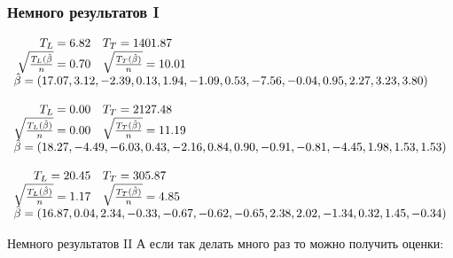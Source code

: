 \documentclass[14pt, fleqn, xcolor={dvipsnames, table}, hyperref={unicode}, babel={english,russian}, inputenc=utf8x]{beamer}
\begin{document}
\begin{frame}[t]\frametitle{Немного результатов I}
\scriptsize
$$\begin{array}{rl}
T_L= 6.82 & T_T = 1401.87 \\ 
\sqrt{\frac{T_L(\hat{\beta}}{n}} = 0.70 & \sqrt{\frac{T_T(\hat{\beta})}{n}} = 10.01 \\ 
\multicolumn{2}{l}{\hat{\beta} = (17.07, 3.12, -2.39, 0.13, 1.94, -1.09, 0.53, -7.56, -0.04, 0.95, 2.27, 3.23, 3.80)} \\ 
\\ 
T_L= 0.00 & T_T = 2127.48 \\ 
\sqrt{\frac{T_L(\hat{\beta})}{n}} = 0.00 & \sqrt{\frac{T_T(\hat{\beta})}{n}} = 11.19 \\ 
\multicolumn{2}{l}{\hat{\beta} = (18.27, -4.49, -6.03, 0.43, -2.16, 0.84, 0.90, -0.91, -0.81, -4.45, 1.98, 1.53, 1.53)} \\ 
\\ 
T_L= 20.45 & T_T = 305.87 \\ 
\sqrt{\frac{T_L(\hat{\beta})}{n}} = 1.17 & \sqrt{\frac{T_T(\hat{\beta})}{n}} = 4.85 \\ 
\multicolumn{2}{l}{\hat{\beta} = (16.87, 0.04, 2.34, -0.33, -0.67, -0.62, -0.65, 2.38, 2.02, -1.34, 0.32, 1.45, -0.34)} \\ 
\end{array}$$
\end{frame}

\begin{frame}{Немного результатов II}
А если так делать много раз то можно получить оценки:
\scriptsize
{}
\end{frame}
\end{document}
